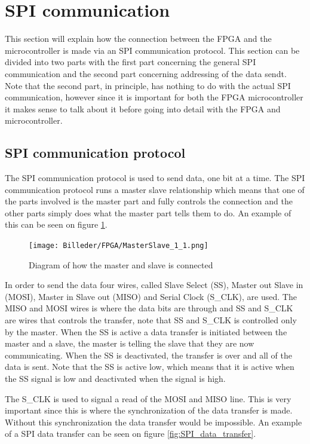 \section{SPI communication}
\label{sec:SPIcommunication}
This section will explain how the connection between the FPGA and the microcontroller is made via an SPI communication protocol. This section can be divided into two parts with the first part concerning the general SPI communication and the second part concerning addressing of the data sendt. Note that the second part, in principle, has nothing to do with the actual SPI communication, however since it is important for both the FPGA microcontroller it makes sense to talk about it before going into detail with the FPGA and microcontroller.

\subsection{SPI communication protocol}

The SPI communication protocol is used to send data, one bit at a time. The SPI communication protocol runs a master slave relationship which means that one of the parts involved is the master part and fully controls the connection and the other parts simply does what the master part tells them to do. An example of this can be seen on figure \ref{fig:MasterSlave_1_1}.

\begin{figure}[h!]
\centering
\texttt{[image: Billeder/FPGA/MasterSlave\_1\_1.png]}
\caption{ Diagram of how the master and slave is connected  }
\label{fig:MasterSlave_1_1}
\end{figure}

In order to send the data four wires, called Slave Select (SS), Master out Slave in (MOSI), Master in Slave out (MISO) and Serial Clock (S\_CLK), are used. The MISO and MOSI wires is where the data bits are through and SS and S\_CLK are wires that controls the transfer, note that SS and S\_CLK is controlled only by the master. When the SS is active a data transfer is initiated between the master and a slave, the master is telling the slave that they are now communicating. When the SS is deactivated, the transfer is over and all of the data is sent. Note that the SS is active low, which means that it is active when the SS signal is low and deactivated when the signal is high.

\newpage

The S\_CLK is used to signal a read of the MOSI and MISO line. This is very important since this is where the synchronization of the data transfer is made. Without this synchronization the data transfer would be impossible.
An example of a SPI data transfer can be seen on figure \ref{fig:SPI_data_transfer}.

